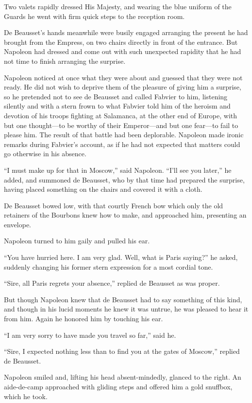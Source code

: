 Two valets rapidly dressed His Majesty, and wearing the blue
uniform of the Guards he went with firm quick steps to the
reception room.

De Beausset's hands meanwhile were busily engaged arranging the
present he had brought from the Empress, on two chairs directly
in front of the entrance. But Napoleon had dressed and come out
with such unexpected rapidity that he had not time to finish
arranging the surprise.

Napoleon noticed at once what they were about and guessed that
they were not ready. He did not wish to deprive them of the
pleasure of giving him a surprise, so he pretended not to see de
Beausset and called Fabvier to him, listening silently and with a
stern frown to what Fabvier told him of the heroism and devotion
of his troops fighting at Salamanca, at the other end of Europe,
with but one thought---to be worthy of their Emperor---and but
one fear---to fail to please him. The result of that battle had
been deplorable. Napoleon made ironic remarks during Fabvier's
account, as if he had not expected that matters could go
otherwise in his absence.

``I must make up for that in Moscow,'' said Napoleon. ``I'll see
you later,'' he added, and summoned de Beausset, who by that time
had prepared the surprise, having placed something on the chairs
and covered it with a cloth.

De Beausset bowed low, with that courtly French bow which only
the old retainers of the Bourbons knew how to make, and
approached him, presenting an envelope.

Napoleon turned to him gaily and pulled his ear.

``You have hurried here. I am very glad. Well, what is Paris
saying?'' he asked, suddenly changing his former stern expression
for a most cordial tone.

``Sire, all Paris regrets your absence,'' replied de Beausset as
was proper.

But though Napoleon knew that de Beausset had to say something of
this kind, and though in his lucid moments he knew it was untrue,
he was pleased to hear it from him. Again he honored him by
touching his ear.

``I am very sorry to have made you travel so far,'' said he.

``Sire, I expected nothing less than to find you at the gates of
Moscow,'' replied de Beausset.

Napoleon smiled and, lifting his head absent-mindedly, glanced to
the right. An aide-de-camp approached with gliding steps and
offered him a gold snuffbox, which he took.

